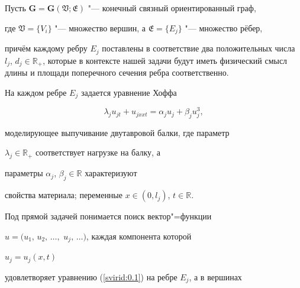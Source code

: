 \date{19/I/2009} %









\maketitle






 Пусть $\mathbf{G}=\mathbf{G}(\mathfrak{V};\mathfrak{E})$ "--- конечный связный ориентированный \linebreak граф,

 где $\mathfrak{V}=\{V_i\}$ "--- множество вершин, а $\mathfrak{E}=\{E_j\}$ "--- множество рёбер,

 причём каждому ребру $E_j$ поставлены в соответствие два положительных числа $l_j$, $d_j\in \mathbb{R}_{+}$,   которые в контексте нашей задачи будут иметь физический смысл длины и площади поперечного сечения ребра соответственно.

 На каждом ребре $E_j$ задается урав\-не\-ние Хоффа

 \begin{equation}\label{svirid:0.1}

 \lambda_ju_{jt}+u_{jxxt}=\alpha_ju_j+\beta_ju_j^3,

 \end{equation}

моделирующее выпучивание двутавровой балки, где параметр

$\lambda_j\in \mathbb{R}_+$ со\-от\-вет\-ству\-ет нагрузке на балку, а

параметры $\alpha_j$, $\beta_j\in \mathbb{R}$ характеризуют

свойства материала; переменные $x\in(0, l_j)$, $t\in

\mathbb{R}$.



Под прямой задачей понимается поиск вектор"=функции

$u=(u_1,\, u_2,\, \dots,$ $u_j,\, \dots)$, каждая компонента которой

$u_j=u_j(x,t)$

удовлетворяет уравнению (\ref{svirid:0.1}) на ребре $E_j$, а в вершинах

